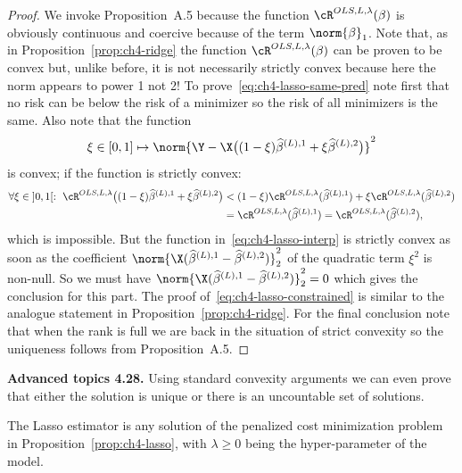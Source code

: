 \begin{proof}
We invoke Proposition~A.5 because the function $\cR^{OLS, L, \lambda}(\beta)$ is obviously continuous and coercive because of the term $\norm{\beta}_1$. Note that, as in
Proposition~\ref{prop:ch4-ridge} the function $\cR^{OLS, L, \lambda}(\beta)$ can be proven to be convex but,
unlike before, it is not necessarily strictly convex because here the norm
appears to power 1 not 2!
To prove~\eqref{eq:ch4-lasso-same-pred} note first that no risk can be below the risk of a minimizer
so the risk of all minimizers is the same. Also note that the function
\begin{equation}\label{eq:ch4-lasso-interp}
\xi \in [0, 1] \mapsto \norm{\Y - \X \bigl( (1 - \xi) \widehat{\beta}^{(L), 1} + \xi \widehat{\beta}^{(L), 2} \bigr)}^2
\end{equation}
is convex; if the function is strictly convex:
\begin{align}
\forall \xi \in\; ]0, 1[:\ \cR^{OLS, L, \lambda}\bigl( (1 - \xi) \widehat{\beta}^{(L), 1} + \xi \widehat{\beta}^{(L), 2} \bigr) &< (1 - \xi) \cR^{OLS, L, \lambda}(\widehat{\beta}^{(L), 1}) + \xi \cR^{OLS, L, \lambda}(\widehat{\beta}^{(L), 2}) \nonumber\\
&= \cR^{OLS, L, \lambda}(\widehat{\beta}^{(L), 1}) = \cR^{OLS, L, \lambda}(\widehat{\beta}^{(L), 2}), \label{eq:ch4-lasso-strict-conv}
\end{align}
which is impossible. But the function in~\eqref{eq:ch4-lasso-interp} is strictly convex as soon
as the coefficient $\norm{\X (\widehat{\beta}^{(L), 1} - \widehat{\beta}^{(L), 2})}_2^2$ of the quadratic term $\xi^2$ is non-null.
So we must have $\norm{\X (\widehat{\beta}^{(L), 1} - \widehat{\beta}^{(L), 2})}_2^2 = 0$ which gives the conclusion for
this part.
The proof of~\eqref{eq:ch4-lasso-constrained} is similar to the analogue statement in Proposition~\ref{prop:ch4-ridge}.
For the final conclusion note that when the rank is full we are back in the
situation of strict convexity so the uniqueness follows from Proposition~A.5.
\end{proof}

\begin{tcolorbox}[advancedbox]
\textbf{Advanced topics 4.28.} Using standard convexity arguments we can
even prove that either the solution is unique or there is an uncountable
set of solutions.
\end{tcolorbox}

\begin{definition}
The Lasso estimator is any solution of
the penalized cost minimization problem in Proposition~\ref{prop:ch4-lasso}, with $\lambda \ge 0$ being
the hyper-parameter of the model.
\end{definition}

